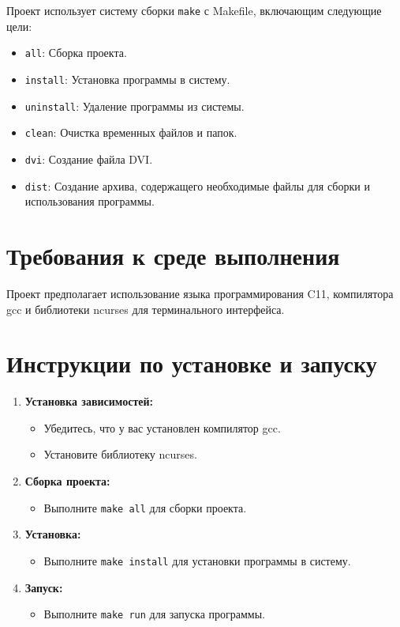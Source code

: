 \documentclass[a4paper,12pt]{article}
\begin{document}
Проект использует систему сборки \texttt{make} с Makefile, включающим следующие цели:

\begin{itemize}
    \item \texttt{all}: Сборка проекта.
    \item \texttt{install}: Установка программы в систему.
    \item \texttt{uninstall}: Удаление программы из системы.
    \item \texttt{clean}: Очистка временных файлов и папок.
    \item \texttt{dvi}: Создание файла DVI.
    \item \texttt{dist}: Создание архива, содержащего необходимые файлы для сборки и использования программы.
\end{itemize}

\section{Требования к среде выполнения}

Проект предполагает использование языка программирования C11, компилятора gcc и библиотеки ncurses для терминального интерфейса.

\section{Инструкции по установке и запуску}

\begin{enumerate}
    \item \textbf{Установка зависимостей:}
        \begin{itemize}
            \item Убедитесь, что у вас установлен компилятор gcc.
            \item Установите библиотеку ncurses.
        \end{itemize}
    \item \textbf{Сборка проекта:}
        \begin{itemize}
            \item Выполните \texttt{make all} для сборки проекта.
        \end{itemize}
    \item \textbf{Установка:}
        \begin{itemize}
            \item Выполните \texttt{make install} для установки программы в систему.
        \end{itemize}
    \item \textbf{Запуск:}
        \begin{itemize}
            \item Выполните \texttt{make run} для запуска программы.
        \end{itemize}
\end{enumerate}
\end{document}
